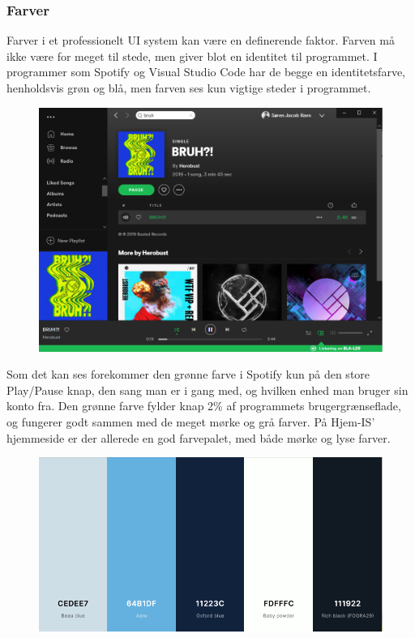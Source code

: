 \subsubsection{Farver}
Farver i et professionelt UI system kan være en definerende faktor. Farven må ikke være for meget til stede, men giver blot en identitet til programmet. I programmer som Spotify og Visual Studio Code har de begge en identitetsfarve, henholdsvis grøn og blå, men farven ses kun vigtige steder i programmet. 
\begin{figure}
    \centering
    \includegraphics[width=\textwidth]{figures/Preliminary/Spotify.png}
    \label{fig:spotify}
\end{figure}
Som det kan ses forekommer den grønne farve i Spotify kun på den store Play/Pause knap, den sang man er i gang med, og hvilken enhed man bruger sin konto fra. Den grønne farve fylder knap 2\% af programmets brugergrænseflade, og fungerer godt sammen med de meget mørke og grå farver. 
På Hjem-IS' hjemmeside \cite{hjemis} er der allerede en god farvepalet, med både mørke og lyse farver. 
\begin{figure}
    \centering
    \includegraphics[width=\textwidth]{figures/Preliminary/farvepalet.png}
    \label{fig:farvepalet}
\end{figure}
